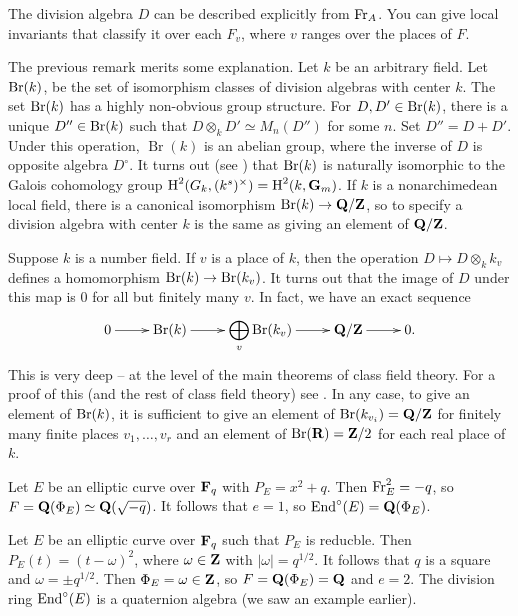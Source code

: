 The division algebra $D$ can be described explicitly from $\mathrm{Fr}_A$. You can 
give local invariants that classify it over each $F_v$, where $v$ ranges over 
the places of $F$. 

The previous remark merits some explanation. Let $k$ be an arbitrary field. 
Let $\operatorname{Br}(k)$, be the set of isomorphism classes of division algebras with 
center $k$. The set $\operatorname{Br}(k)$ has a highly non-obvious group structure. For 
$D,D'\in \operatorname{Br}(k)$, there is a unique $D''\in \operatorname{Br}(k)$ such that 
$D\otimes_k D'\simeq M_n(D'')$ for some $n$. Set $D''=D+D'$. Under this 
operation, $\operatorname{Br}(k)$ is an abelian group, where the inverse of 
$D$ is opposite algebra $D^\circ$. It turns out (see 
\cite[X.5]{se79}) that $\operatorname{Br}(k)$ is naturally isomorphic to the Galois 
cohomology group $\operatorname{H}^2(G_k,(k^s)^\times) = \operatorname{H}^2(k,\mathbf{G}_m)$. If $k$ is a 
nonarchimedean local field, there is a canonical isomorphism 
$\operatorname{Br}(k) \to \mathbf{Q}/\mathbf{Z}$, so to specify a division algebra with center $k$ is 
the same as giving an element of $\mathbf{Q}/\mathbf{Z}$. 

Suppose $k$ is a number field. If $v$ is a place of $k$, then the operation 
$D\mapsto D\otimes_k k_v$ defines a homomorphism $\operatorname{Br}(k) \to \operatorname{Br}(k_v)$. 
It turns out that the image of $D$ under this map is $0$ for all but finitely 
many $v$. In fact, we have an exact sequence
\[\xymatrix{
  0 \ar[r] 
    & \brauer(k) \ar[r] 
    & \displaystyle\bigoplus_v \brauer(k_v) \ar[r] 
    & \dQ/\dZ \ar[r] 
    & 0 \text{.}
}\]
This is very deep -- at the level of the main theorems of class field theory. 
For a proof of this (and the rest of class field theory) see 
\cite[2.86]{sh92}. In any case, to give an element of $\operatorname{Br}(k)$, it is 
sufficient to  give an element of $\operatorname{Br}(k_{v_i})=\mathbf{Q}/\mathbf{Z}$ for finitely many 
finite places $v_1,\dots,v_r$ and an element of $\operatorname{Br}(\mathbf{R})=\mathbf{Z}/2$ for each 
real place of $k$.

\begin{example}
Let $E$ be an elliptic curve over $\mathbf{F}_q$ with $P_E=x^2+q$. Then $\mathrm{Fr}_E^2=-q$, 
so $F=\mathbf{Q}(\Phi_E)\simeq\mathbf{Q}(\sqrt{-q})$. It follows that $e=1$, so  
$\operatorname{End}^\circ(E)=\mathbf{Q}(\Phi_E)$. 
\end{example}

\begin{example}
Let $E$ be an elliptic curve over $\mathbf{F}_q$ such that $P_E$ is reducble. Then 
$P_E(t)=(t-\omega)^2$, where $\omega\in \mathbf{Z}$ with $|\omega|=q^{1/2}$. It 
follows that $q$ is a square and $\omega=\pm q^{1/2}$. Then 
$\Phi_E=\omega\in \mathbf{Z}$, so $F=\mathbf{Q}(\Phi_E)=\mathbf{Q}$ and $e=2$. The division ring  
$\operatorname{End}^\circ (E)$ is a quaternion algebra (we saw an example earlier). 
\end{example}


